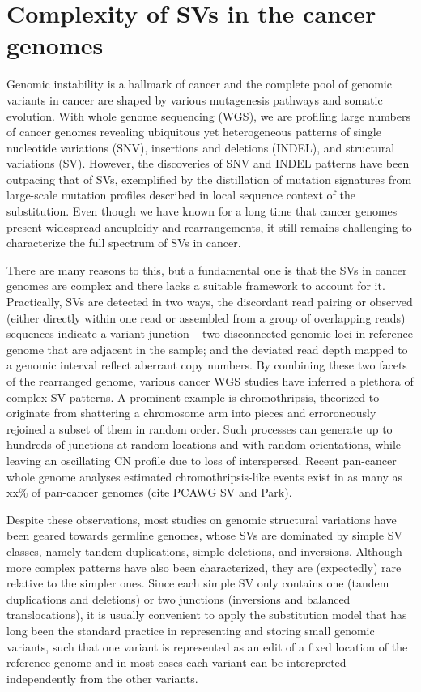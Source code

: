 \documentclass[phd,tocprelim]{cornell}
\begin{document}
\section{Complexity of SVs in the cancer genomes}
Genomic instability is a hallmark of cancer and the complete pool of genomic variants in cancer are shaped by various mutagenesis pathways and somatic evolution. With whole genome sequencing (WGS), we are profiling large numbers of cancer genomes revealing ubiquitous yet heterogeneous patterns of single nucleotide variations (SNV), insertions and deletions (INDEL), and structural variations (SV). However, the discoveries of SNV and INDEL patterns have been outpacing that of SVs, exemplified by the distillation of mutation signatures from large-scale mutation profiles described in local sequence context of the substitution. Even though we have known for a long time that cancer genomes present widespread aneuploidy and rearrangements, it still remains challenging to characterize the full spectrum of SVs in cancer.

There are many reasons to this, but a fundamental one is that the SVs in cancer genomes are complex and there lacks a suitable framework to account for it. Practically, SVs are detected in two ways, the discordant read pairing or observed (either directly within one read or assembled from a group of overlapping reads) sequences indicate a variant junction -- two disconnected genomic loci in reference genome that are adjacent in the sample; and the deviated read depth mapped to a genomic interval reflect aberrant copy numbers. By combining these two facets of the rearranged genome, various cancer WGS studies have inferred a plethora of complex SV patterns. A prominent example is chromothripsis, theorized to originate from shattering a chromosome arm into pieces and erroroneously rejoined a subset of them in random order. Such processes can generate up to hundreds of junctions at random locations and with random orientations, while leaving an oscillating CN profile due to loss of interspersed. Recent pan-cancer whole genome analyses estimated chromothripsis-like events exist in as many as xx\% of pan-cancer genomes (cite PCAWG SV and Park).

Despite these observations, most studies on genomic structural variations have been geared towards germline genomes, whose SVs are dominated by simple SV classes, namely tandem duplications, simple deletions, and inversions. Although more complex patterns have also been characterized, they are (expectedly) rare relative to the simpler ones. Since each simple SV only contains one (tandem duplications and deletions) or two junctions (inversions and balanced translocations), it is usually convenient to apply the substitution model that has long been the standard practice in representing and storing small genomic variants, such that one variant is represented as an edit of a fixed location of the reference genome and in most cases each variant can be interepreted independently from the other variants.
\end{document}
